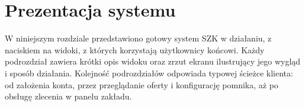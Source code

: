 
\chapter{Prezentacja systemu}
\label{cha:prezentacja}

W niniejszym rozdziale przedstawiono gotowy system SZK w działaniu, z naciskiem na widoki, z których korzystają użytkownicy końcowi. Każdy podrozdział zawiera krótki opis widoku oraz zrzut ekranu ilustrujący jego wygląd i sposób działania. Kolejność podrozdziałów odpowiada typowej ścieżce klienta: od założenia konta, przez przeglądanie oferty i konfigurację pomnika, aż po obsługę zlecenia w panelu zakładu.







